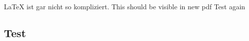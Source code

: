 \documentclass{article}
\begin{document}
	\LaTeX{} ist gar nicht so kompliziert.
	This should be visible in new pdf
	Test again
	\subsection{Test}
\end{document}
